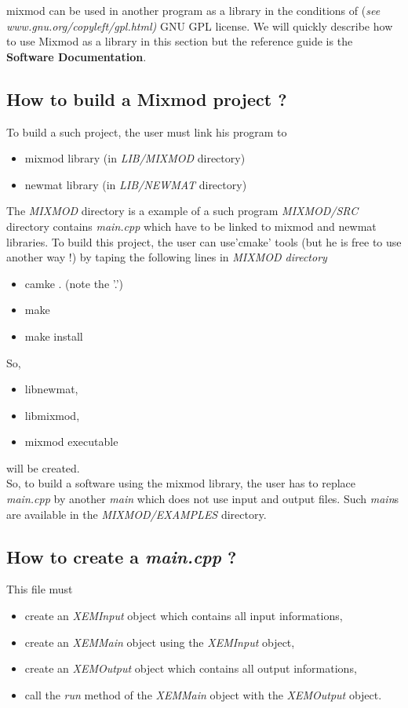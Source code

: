 {\sc mixmod} can be used in another program as a library in the conditions of ({\it see
www.gnu.org/copyleft/gpl.html)} GNU GPL license.
We will quickly describe how to
use Mixmod as a library in this section but the reference guide is the {\bf Software Documentation}.\\


\subsection{How to build a Mixmod project ?}
To build a such project, the user must link his program to
\begin{itemize}
	\item {\sc mixmod} library (in \textit{LIB/MIXMOD} directory)
	\item {\sc newmat} library (in \textit{LIB/NEWMAT} directory)
\end{itemize}
The \textit{MIXMOD} directory is a example of a such program \textit{MIXMOD/SRC} directory contains \textit{main.cpp} which have to be linked to {\sc mixmod} and {\sc newmat} libraries.
To build this project, the user can use'cmake' tools (but he is free to use another way !) by taping the following lines in \it{MIXMOD} directory
\begin{itemize}
  \item camke . (note the '.')
  \item make
  \item make install
\end{itemize}
So,
\begin{itemize}
  \item libnewmat,
  \item libmixmod,
  \item mixmod executable
\end{itemize}
will be created.\\
So, to build a software using the {\sc mixmod} library, the user has to replace \textit{main.cpp} by another \textit{main} which does not use input and output files. Such \textit{main}s are available in the \textit{MIXMOD/EXAMPLES} directory.\\


\subsection{How to create a {\it main.cpp} ?}
This file must
\begin{itemize}
  \item create an {\it XEMInput} object which contains all input informations,
  \item create an {\it XEMMain} object using the {\it XEMInput} object,
  \item create an {\it XEMOutput} object which contains all output informations,
  \item call the {\it run} method of the {\it XEMMain} object with the {\it XEMOutput} object.
\end{itemize}




